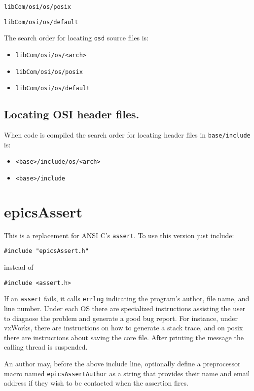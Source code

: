  \verb|libCom/osi/os/posix|

 \verb|libCom/osi/os/default|

The search order for locating \verb|osd| source files is:

\begin{itemize}\item \verb|libCom/osi/os/<arch>|

\item \verb|libCom/osi/os/posix|

\item \verb|libCom/osi/os/default|

\end{itemize}\subsection{Locating OSI header files.}

When code is compiled the search order for locating header files in \verb|base/include| is:

\begin{itemize}\item \verb|<base>/include/os/<arch>|

\item \verb|<base>/include|

\end{itemize}\section{epicsAssert}

This is a replacement for ANSI C's \verb|assert|. To use this version just include:

\begin{verbatim}#include "epicsAssert.h"
\end{verbatim}instead of

\begin{verbatim}#include <assert.h>
\end{verbatim}If an \verb|assert| fails, it calls \verb|errlog| indicating the program's author, file name, and line number. Under each OS there are 
specialized instructions assisting the user to diagnose the problem and generate a good bug report. For instance, under 
vxWorks, there are instructions on how to generate a stack trace, and on posix there are instructions about saving the core 
file. After printing the message the calling thread is suspended.

An author may, before the above include line, optionally define a preprocessor macro named \verb|epicsAssertAuthor| as 
a string that provides their name and email address if they wish to be contacted when the assertion fires.

